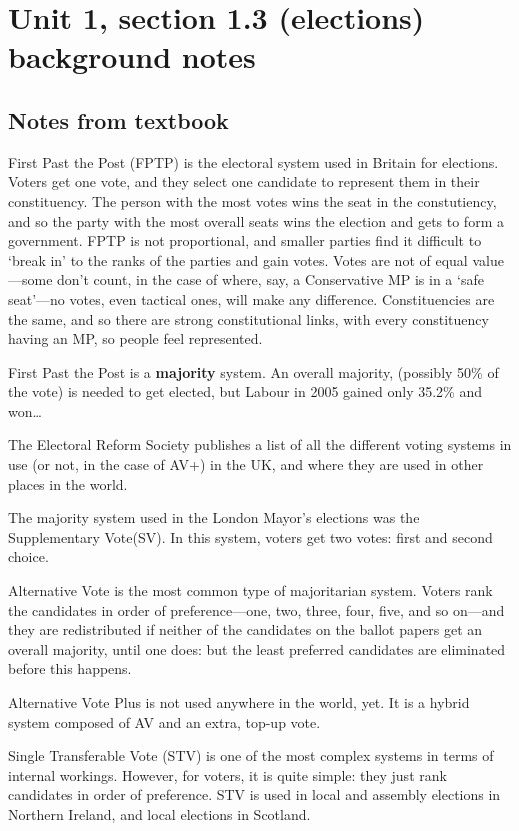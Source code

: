 \documentclass[12pt]{article}
\begin{document}
\section*{Unit 1, section 1.3 (elections) background notes}

	\subsection*{Notes from textbook}

First Past the Post (FPTP) is the electoral system used in Britain for
elections.  Voters get one vote, and they select one candidate to represent
them in their constituency.   The person with the most votes wins the seat
in the constutiency, and so the party with the most overall seats wins the
election and gets to form a government.  FPTP is not proportional, and
smaller parties find it difficult to `break in' to the ranks of the parties
and gain votes.  Votes are not of equal value---some don't count, in the
case of where, say, a Conservative MP is in a `safe seat'---no votes, even
tactical ones, will make any difference.  Constituencies are the same, and
so there are strong constitutional links, with every constituency having an
MP, so people feel represented.

First Past the Post is a \textbf{majority} system.  An overall majority,
(possibly 50\% of the vote) is needed to get elected, but Labour in 2005
gained only 35.2\% and won\ldots

The Electoral Reform Society publishes a list of all the different voting
systems in use (or not, in the case of AV+) in the UK, and where they are
used in other places in the world.

The majority system used in the London Mayor's elections was the
Supplementary Vote(SV).  In this system, voters get two votes: first and
second choice.

Alternative Vote is the most common type of majoritarian system.  Voters
rank the candidates in order of preference---one, two, three, four, five,
and so on---and they are redistributed if neither of the candidates on the
ballot papers get an overall majority, until one does: but the least
preferred candidates are eliminated before this happens.

Alternative Vote Plus is not used anywhere in the world, yet.  It is a
hybrid system composed of AV and an extra, top-up vote.

Single Transferable Vote (STV) is one of the most complex systems in terms
of internal workings.  However, for voters, it is quite simple: they just
rank candidates in order of preference.  STV is used in local and assembly
elections in Northern Ireland, and local elections in Scotland.
\end{document}
